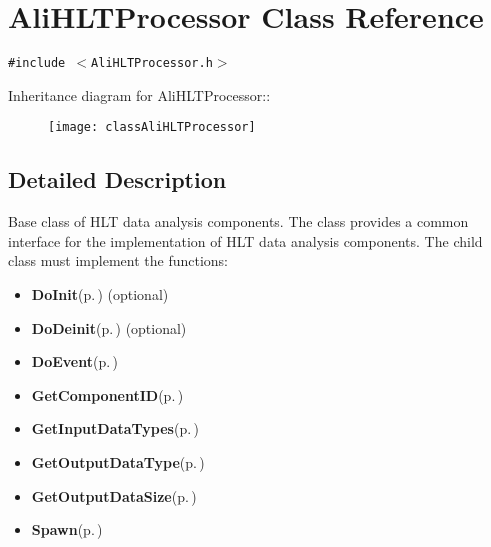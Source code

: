 \section{Ali\-HLTProcessor Class Reference}
\label{classAliHLTProcessor}
{\tt \#include $<$Ali\-HLTProcessor.h$>$}

Inheritance diagram for Ali\-HLTProcessor::\begin{figure}[H]
\begin{center}
\leavevmode
\texttt{[image: classAliHLTProcessor]}
\end{center}
\end{figure}


\subsection{Detailed Description}
Base class of HLT data analysis components. The class provides a common interface for the implementation of HLT data analysis components. The child class must implement the functions:\begin{itemize}
\item {\bf Do\-Init}{\rm (p.\,\pageref{classAliHLTComponent_b5})} (optional)\item {\bf Do\-Deinit}{\rm (p.\,\pageref{classAliHLTComponent_b6})} (optional)\item {\bf Do\-Event}{\rm (p.\,\pageref{classAliHLTProcessor_d0})}\item {\bf Get\-Component\-ID}{\rm (p.\,\pageref{classAliHLTComponent_a9})}\item {\bf Get\-Input\-Data\-Types}{\rm (p.\,\pageref{classAliHLTComponent_a10})}\item {\bf Get\-Output\-Data\-Type}{\rm (p.\,\pageref{classAliHLTComponent_a11})}\item {\bf Get\-Output\-Data\-Size}{\rm (p.\,\pageref{classAliHLTComponent_a12})}\item {\bf Spawn}{\rm (p.\,\pageref{classAliHLTComponent_a13})} \end{itemize}




